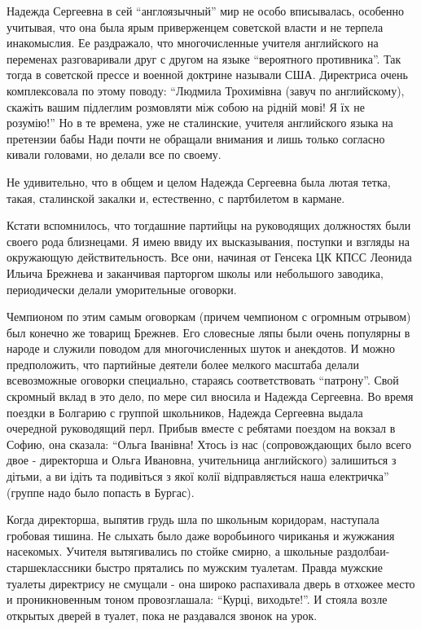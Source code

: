 Надежда Сергеевна в сей \enquote{англоязычный} мир не особо вписывалась, особенно
учитывая, что она была ярым приверженцем советской власти и не терпела
инакомыслия. Ее раздражало, что многочисленные учителя английского на переменах
разговаривали друг с другом на языке \enquote{вероятного противника}. Так тогда в
советской прессе и военной доктрине называли США. Директриса очень
комплексовала по этому поводу: \enquote{Людмила Трохимівна (завуч по английскому),
скажіть вашим підлеглим розмовляти між собою на рідній мові! Я їх не розумію!}
Но в те времена, уже не сталинские, учителя английского языка на претензии бабы
Нади почти не обращали внимания и лишь только согласно кивали головами, но
делали все по своему.

Не удивительно, что в общем и целом Надежда Сергеевна была лютая тетка, такая,
сталинской закалки и, естественно, с партбилетом в кармане.

Кстати вспомнилось, что тогдашние партийцы на руководящих должностях были
своего рода близнецами. Я имею ввиду их высказывания, поступки и взгляды на
окружающую действительность. Все они, начиная от Генсека ЦК КПСС Леонида Ильича
Брежнева и заканчивая парторгом школы или небольшого заводика, периодически
делали уморительные оговорки. 

Чемпионом по этим самым оговоркам (причем
чемпионом с огромным отрывом) был конечно же товарищ Брежнев. Его словесные
ляпы были очень популярны в народе и служили поводом для многочисленных шуток и
анекдотов. И можно предположить, что партийные деятели более мелкого масштаба
делали всевозможные оговорки специально, стараясь соответствовать \enquote{патрону}.
Свой скромный вклад в это дело, по мере сил вносила и Надежда Сергеевна. Во
время поездки в Болгарию с группой школьников, Надежда Сергеевна выдала
очередной руководящий перл. Прибыв вместе с ребятами поездом на вокзал в Софию,
она сказала: \enquote{Ольга Іванівна! Хтось із нас (сопровождающих было всего двое -
директорша и Ольга Ивановна, учительница английского) залишиться з дітьми, а ви
ідіть та подивіться з якої колії відправляється наша електричка} (группе надо
было попасть в Бургас).

Когда директорша, выпятив грудь шла по школьным коридорам, наступала гробовая
тишина. Не слыхать было даже воробьиного чириканья и жужжания насекомых.
Учителя вытягивались по стойке смирно, а школьные раздолбаи-старшеклассники
быстро прятались по мужским туалетам. Правда мужские туалеты директрису не
смущали - она широко распахивала дверь в отхожее место и проникновенным тоном
провозглашала: \enquote{Курці, виходьте!}. И стояла возле открытых дверей в туалет,
пока не раздавался звонок на урок. 

